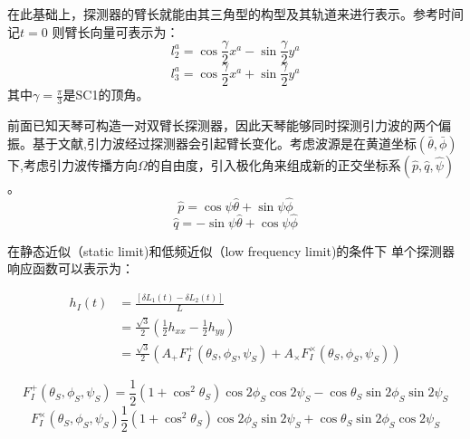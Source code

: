 在此基础上，探测器的臂长就能由其三角型的构型及其轨道来进行表示。参考时间记$t=0$
则臂长向量可表示为：
\begin{equation}
l_2^a=\cos{\frac{\gamma}{2}}x^a -\sin{\frac{\gamma}{2}y^a}
\end{equation}
\begin{equation}
l_3^a=\cos{\frac{\gamma}{2}}x^a +\sin{\frac{\gamma}{2}y^a}
\end{equation}
其中$\gamma=\frac{\pi}{3}$是SC1的顶角。



前面已知天琴可构造一对双臂长探测器，因此天琴能够同时探测引力波的两个偏振。基于文献\cite{cornish2001space}\cite{cornish2003lisa}\cite{cutler1998angular},引力波经过探测器会引起臂长变化。考虑波源是在黄道坐标$(\bar{\theta},\bar{\phi})$下,考虑引力波传播方向$\Omega$的自由度，引入极化角来组成新的正交坐标系$\left(
\hat{p},\hat{q},\hat{\psi} \right)$。
\begin{equation}
\hat{p}=\cos \psi\hat{\theta} +\sin{\psi}\hat{\phi}
\end{equation}
\begin{equation}
\hat{q}=-\sin\psi \hat{\theta} + \cos \psi \hat{\phi}
\end{equation}

在静态近似（static limit)和低频近似（low frequency limit)的条件下
单个探测器响应函数可以表示为：

\begin{equation}
\begin{aligned}
h_I(t) &= \frac{\left [\delta L_1(t)-\delta L_2(t) \right ]} {L} \\ 
& =\frac{\sqrt{3}}{2}(\frac{1}{2}h_{xx}-\frac{1}{2}h_{yy}) \\
& =\frac{\sqrt{3}}{2}(A_{+}F^+_I(\theta_S,\phi_S,\psi_S)+A_{\times}F_I^{\times}(\theta_S,\phi_S,\psi_S))
\end{aligned}
\end{equation}

\begin{equation}
F^+_I(\theta_S,\phi_S,\psi_S)=\frac{1}{2}(1+\cos^2\theta_S)\cos 2\phi_S \cos 2\psi_S -\cos\theta_S \sin2\phi_S \sin 2\psi_S
\end{equation}
\begin{equation}
F_I^{\times}(\theta_S,\phi_S,\psi_S)\frac{1}{2}(1+\cos^2\theta_S)\cos 2\phi_S \sin 2\psi_S +\cos\theta_S \sin2\phi_S \cos 2\psi_S
\end{equation}

